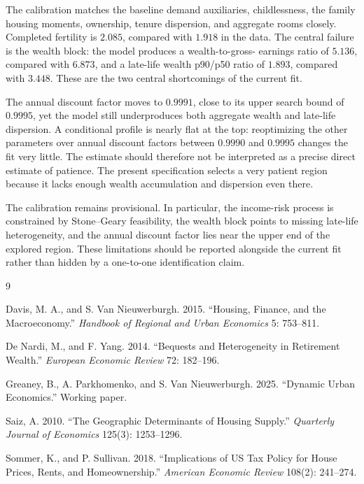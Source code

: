 \documentclass[11pt]{article}
\begin{document}
The calibration matches the baseline demand auxiliaries, childlessness, the
family housing moments, ownership, tenure dispersion, and aggregate rooms
closely. Completed fertility is $2.085$, compared with $1.918$ in the data.
The central failure is the wealth block: the model produces a wealth-to-gross-
earnings ratio of $5.136$, compared with $6.873$, and a late-life wealth
p90/p50 ratio of $1.893$, compared with $3.448$. These are the two central
shortcomings of the current fit.

The annual discount factor moves to $0.9991$, close to its upper search bound
of $0.9995$, yet the model still underproduces both aggregate wealth and
late-life dispersion. A conditional profile is nearly flat at the top:
reoptimizing the other parameters over annual discount factors between
$0.9990$ and $0.9995$ changes the fit very little. The estimate should
therefore not be interpreted as a precise direct estimate of patience. The present
specification selects a very patient region because it lacks enough wealth
accumulation and dispersion even there.

The calibration remains provisional. In particular, the income-risk process
is constrained by Stone--Geary feasibility, the wealth block points to missing
late-life heterogeneity, and the annual discount factor lies near the upper
end of the explored region. These limitations should be reported alongside
the current fit rather than hidden by a one-to-one identification claim.

\begin{thebibliography}{9}

Davis, M. A., and S. Van Nieuwerburgh. 2015.
``Housing, Finance, and the Macroeconomy.''
\emph{Handbook of Regional and Urban Economics} 5: 753--811.

De Nardi, M., and F. Yang. 2014.
``Bequests and Heterogeneity in Retirement Wealth.''
\emph{European Economic Review} 72: 182--196.

Greaney, B., A. Parkhomenko, and S. Van Nieuwerburgh. 2025.
``Dynamic Urban Economics.'' Working paper.

Saiz, A. 2010.
``The Geographic Determinants of Housing Supply.''
\emph{Quarterly Journal of Economics} 125(3): 1253--1296.

Sommer, K., and P. Sullivan. 2018.
``Implications of US Tax Policy for House Prices, Rents, and Homeownership.''
\emph{American Economic Review} 108(2): 241--274.

\end{thebibliography}
\end{document}

